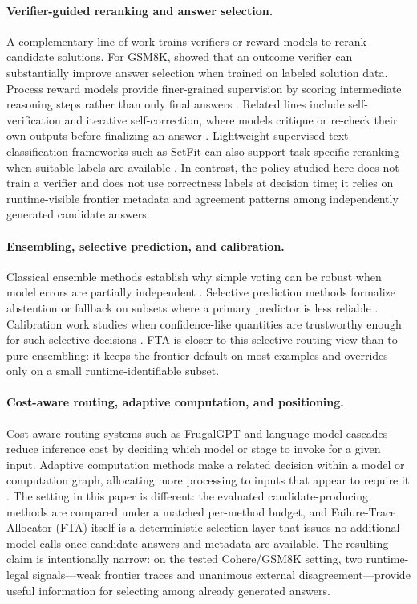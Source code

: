 \paragraph{Verifier-guided reranking and answer selection.}
A complementary line of work trains verifiers or reward models to rerank candidate solutions.
For GSM8K, \citet{cobbe2021training} showed that an outcome verifier can substantially improve answer selection when trained on labeled solution data.
Process reward models provide finer-grained supervision by scoring intermediate reasoning steps rather than only final answers \citep{lightman2024lets}.
Related lines include self-verification and iterative self-correction, where models critique or re-check their own outputs before finalizing an answer \citep{weng2023largelanguagemodelsbetter,madaan2023selfrefine}.
Lightweight supervised text-classification frameworks such as SetFit can also support task-specific reranking when suitable labels are available \citep{tunstall2022efficient}.
In contrast, the policy studied here does not train a verifier and does not use correctness labels at decision time; it relies on runtime-visible frontier metadata and agreement patterns among independently generated candidate answers.

\paragraph{Ensembling, selective prediction, and calibration.}
Classical ensemble methods establish why simple voting can be robust when model errors are partially independent \citep{dietterich2000ensemble}.
Selective prediction methods formalize abstention or fallback on subsets where a primary predictor is less reliable \citep{geifman2017selectiveclassificationdeepneural}.
Calibration work studies when confidence-like quantities are trustworthy enough for such selective decisions \citep{guo2017calibrationmodernneuralnetworks}.
FTA is closer to this selective-routing view than to pure ensembling: it keeps the frontier default on most examples and overrides only on a small runtime-identifiable subset.

\paragraph{Cost-aware routing, adaptive computation, and positioning.}
Cost-aware routing systems such as FrugalGPT \citep{chen2023frugalgpt} and language-model cascades \citep{dohan2022language} reduce inference cost by deciding which model or stage to invoke for a given input.
Adaptive computation methods make a related decision within a model or computation graph, allocating more processing to inputs that appear to require it \citep{graves2016adaptive}.
The setting in this paper is different: the evaluated candidate-producing methods are compared under a matched per-method budget, and Failure-Trace Allocator (FTA) itself is a deterministic selection layer that issues no additional model calls once candidate answers and metadata are available.
The resulting claim is intentionally narrow: on the tested Cohere/GSM8K setting, two runtime-legal signals---weak frontier traces and unanimous external disagreement---provide useful information for selecting among already generated answers.
